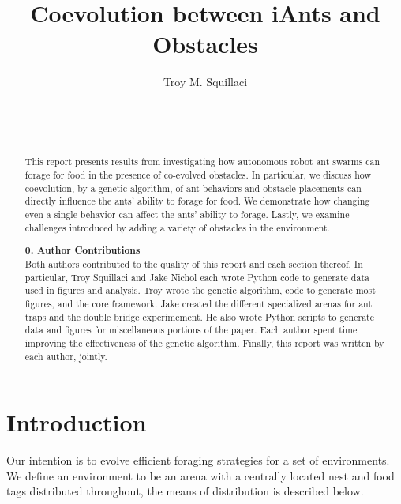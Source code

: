 \documentclass{acm_proc_article-sp}
\begin{document}
\title{Coevolution between iAnts and Obstacles}

\author{
\alignauthor
Troy M. Squillaci\\
       \\
       \\
       \\
}

\maketitle
\begin{abstract}
This report presents results from investigating how autonomous robot ant swarms can forage for food in the presence of co-evolved obstacles. In particular, we discuss how coevolution, by a genetic algorithm, of ant behaviors and obstacle placements can directly influence the ants' ability to forage for food. We demonstrate how changing even a single behavior can affect the ants' ability to forage. Lastly, we examine challenges introduced by adding a variety of obstacles in the environment.

\textbf{0. Author Contributions} \\
Both authors contributed to the quality of this report and each section thereof. In particular, Troy Squillaci and Jake Nichol each wrote Python code to generate data used in figures and analysis. Troy wrote the genetic algorithm, code to generate most figures, and the core framework. Jake created the different specialized arenas for ant traps and the double bridge experimement. He also wrote Python scripts to generate data and figures for miscellaneous portions of the paper. Each author spent time improving the effectiveness of the genetic algorithm. Finally, this report was written by each author, jointly. 

\end{abstract}

\section{Introduction}
Our intention is to evolve efficient foraging strategies for a set of environments. We define an environment to be an arena with a centrally located nest and food tags distributed throughout, the means of distribution is described below. 
\end{document}
